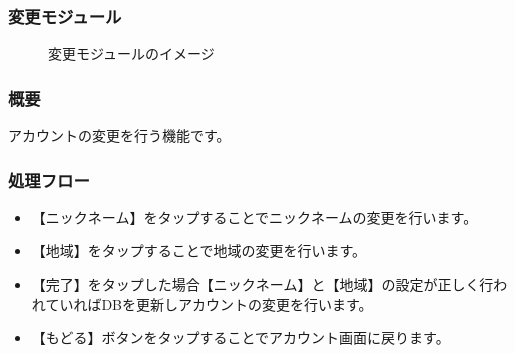 \documentclass[a4j]{jarticle}
\begin{document}
\subsubsection{変更モジュール\label{変更}} %
\begin{figure}[H]
    \begin{center}
    \caption {変更モジュールのイメージ}
    \label{functionselection}
    \end{center}
\end{figure}
\subsubsection*{概要}
アカウントの変更を行う機能です。
\subsubsection*{処理フロー}
\begin{itemize}
\item 【ニックネーム】をタップすることでニックネームの変更を行います。
\item 【地域】をタップすることで地域の変更を行います。
\item 【完了】をタップした場合【ニックネーム】と【地域】の設定が正しく行われていればDBを更新しアカウントの変更を行います。
\item 【もどる】ボタンをタップすることでアカウント画面に戻ります。
\end{itemize}
\end{document}

